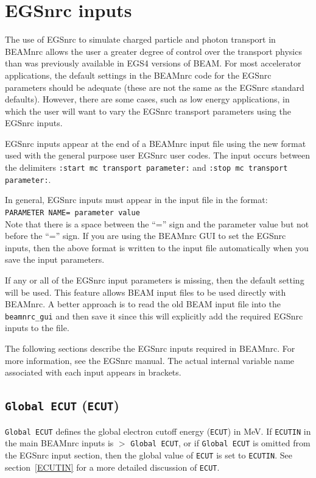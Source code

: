 \documentclass[12pt,twoside]{article}
\begin{document}
\section{EGSnrc inputs}
\label{egsnrc_inputs}

The use of EGSnrc to simulate charged particle and photon transport
in BEAMnrc allows the user a greater degree of control over the
transport physics
than was previously available in EGS4 versions of BEAM.  For most
accelerator applications, the default settings in the BEAMnrc code for the EGSnrc
parameters should be adequate (these are not the same as the EGSnrc
standard defaults).   However, there are some cases, such
as low energy applications, in which the user will want to vary
the EGSnrc transport parameters using the EGSnrc inputs.

EGSnrc inputs appear at the end of a BEAMnrc input file using the new
format used with the general purpose user EGSnrc user codes.  The input
occurs between the
delimiters {\tt :start mc transport parameter:} and
{\tt :stop mc transport parameter:}.

In general, EGSnrc inputs must appear in the input file in
the format:\\
{\tt PARAMETER NAME= parameter value}\\
Note that there is a space between the ``='' sign and the parameter value
but not before the ``='' sign.
If you are using the BEAMnrc GUI to set the EGSnrc inputs, then
the above format is written to the input file automatically when you save
the input parameters.

If any or all of the EGSnrc input parameters is missing, then the default
setting will be used. This feature allows BEAM input files to be used
directly with BEAMnrc. A better approach is to read the old BEAM input
file into the {\tt beamnrc\_gui} and then save it since this will explicitly
add the required EGSnrc inputs to the file.

The following sections describe the EGSnrc inputs required in
BEAMnrc.  For more information, see the EGSnrc manual\cite{KR03}. The
actual internal variable name associated with each input appears in brackets.

\subsection{ {\tt Global ECUT} ({\tt ECUT})}
\label{globalecutsect}
{\tt Global ECUT} defines the global electron cutoff energy ({\tt ECUT})
in MeV.  If {\tt ECUTIN}
in the main
BEAMnrc inputs is $>$ {\tt Global ECUT}, or if {\tt Global ECUT} is
omitted from the EGSnrc input section, then the global value of
{\tt ECUT} is set to {\tt ECUTIN}.  See section~\ref{ECUTIN} for a more
detailed discussion of {\tt ECUT}.
\end{document}
